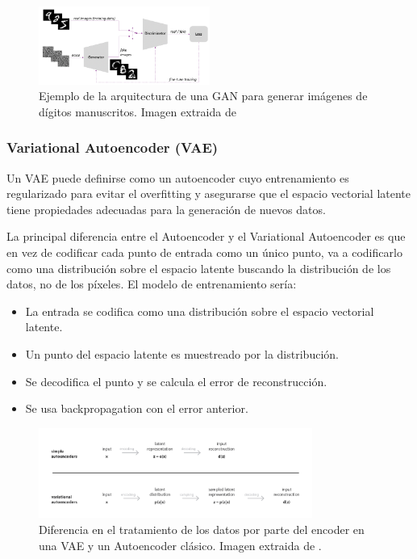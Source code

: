             \begin{figure}[!h]
                \centering
                \includegraphics[width=0.5\textwidth]{img/GAN.png}
                \caption{Ejemplo de la arquitectura de una GAN para generar imágenes de dígitos manuscritos. Imagen extraida de \cite{AAE}}
                \label{fig:GAN}
            \end{figure}
 
        \subsubsection{Variational Autoencoder (VAE)}
            \noindent Un VAE puede definirse como un autoencoder cuyo entrenamiento es regularizado para evitar el overfitting y asegurarse que el espacio vectorial latente tiene propiedades adecuadas para la generación de nuevos datos.

            \medskip

            \noindent La principal diferencia entre el Autoencoder y el Variational Autoencoder es que en vez de codificar cada punto de entrada como un único punto, va a codificarlo como una distribución sobre el espacio latente buscando la distribución de los datos, no de los píxeles. El modelo de entrenamiento sería:
            
            \begin{itemize}
                \item La entrada se codifica como una distribución sobre el espacio vectorial latente.
                \item Un punto del espacio latente es muestreado por la distribución. 
                \item Se decodifica el punto y se calcula el error de reconstrucción.
                \item Se usa backpropagation con el error anterior.
            \end{itemize}

            \begin{figure}[!h]
                \centering
                \includegraphics[width=0.8\textwidth]{img/vae_1.png}
                \caption{Diferencia en el tratamiento de los datos por parte del encoder en una VAE y un Autoencoder clásico. Imagen extraida de \cite{VAE}.}
                \label{fig:VAE_1}
            \end{figure}

